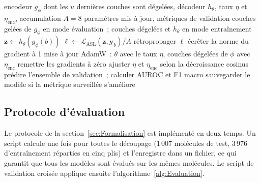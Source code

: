 \begin{algorithm}
   \caption{Une époque d'apprentissage}
   \label{alg:Entrainement}
   \begin{algorithmic}[1]
      \REQUIRE encodeur $g_\phi$ dont les $u$ dernières couches sont dégelées, décodeur $h_\theta$, taux $\eta$ et $\eta_{\mathrm{enc}}$, accumulation $A = 8$
      \ENSURE paramètres mis à jour, métriques de validation
      \STATE couches gelées de $g_\phi$ en mode évaluation~; couches dégelées et $h_\theta$ en mode entraînement
         \STATE $\mathbf{z} \leftarrow h_\theta(g_\phi(b))$ 
         \STATE $\ell \leftarrow \mathcal{L}_{\mathrm{ASL}}(\mathbf{z}, \mathbf{y}_b) / A$ 
         \STATE rétropropager $\ell$
            \STATE écrêter la norme du gradient à 1
            \STATE mise à jour AdamW~: $\theta$ avec le taux $\eta$, couches dégelées de $\phi$ avec $\eta_{\mathrm{enc}}$
            \STATE remettre les gradients à zéro
         \ENDIF
      \ENDFOR
      \STATE ajuster $\eta$ et $\eta_{\mathrm{enc}}$ selon la décroissance cosinus
      \STATE prédire l'ensemble de validation~; calculer AUROC et F1 macro
      \STATE sauvegarder le modèle si la métrique surveillée s'améliore
   \end{algorithmic}
\end{algorithm}

\subsection{Protocole d'évaluation}

Le protocole de la section~\ref{sec:Formalisation} est implémenté en deux temps.
Un script calcule une fois pour toutes le découpage (1\,007 molécules de test, 3\,976 d'entraînement réparties en cinq plis) et l'enregistre dans un fichier, ce qui garantit que tous les modèles sont évalués sur les mêmes molécules.
Le script de validation croisée applique ensuite l'algorithme~\ref{alg:Evaluation}.

